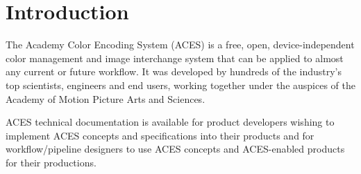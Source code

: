 \unnumberedformat	    %
\chapter{Introduction} 	%

The Academy Color Encoding System (ACES) is a free, open, device-independent color management and image interchange system that can be applied to almost any current or future workflow. It was developed by hundreds of the industry's top scientists, engineers and end users, working together under the auspices of the Academy of Motion Picture Arts and Sciences.

ACES technical documentation is available for product developers wishing to implement ACES concepts and specifications into their products and for workflow/pipeline designers to use ACES concepts and ACES-enabled products for their productions.
